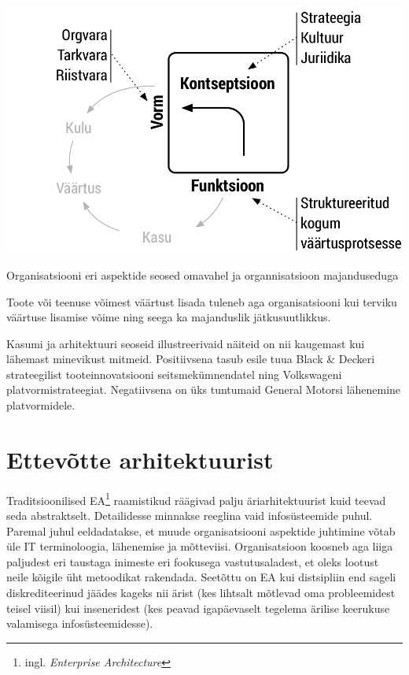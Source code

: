 \documentclass{tufte-book}
\begin{document}
\begin{marginfigure}
	\begin{center}
		\includegraphics[width=\linewidth]{ffc_profit.pdf}
		\caption{Organisatsiooni eri aspektide seosed omavahel ja organnisatsioon majanduseduga}
		\label{fig:arh}
	\end{center}
\end{marginfigure}

Toote või teenuse võimest väärtust lisada tuleneb aga organisatsiooni kui terviku väärtuse lisamise võime ning seega ka majanduslik jätkusuutlikkus. 

Kasumi ja arhitektuuri seoseid illustreerivaid näiteid on nii kaugemast kui lähemast minevikust mitmeid. Positiivsena tasub esile tuua Black \& Deckeri strateegilist tooteinnovatsiooni seitsmekümnendatel ning Volkswageni platvormistrateegiat. Negatiivsena on üks tuntumaid General Motorsi lähenemine platvormidele. 


\section{Ettevõtte arhitektuurist}
Traditsioonilised EA\footnote{ingl. \emph{Enterprise Architecture}} raamistikud räägivad palju äriarhitektuurist kuid teevad seda abstraktselt. Detailidesse minnakse reeglina vaid infosüsteemide puhul. Paremal juhul eeldadatakse, et muude organisatsiooni aspektide juhtimine võtab üle IT terminoloogia, lähenemise ja mõtteviisi. Organisatsioon koosneb aga liiga paljudest eri taustaga inimeste eri fookusega vastutusaladest, et oleks lootust neile kõigile üht metoodikat rakendada.  Seetõttu on EA kui distsipliin end sageli diskrediteerinud jäädes kageks nii ärist (kes lihtsalt mõtlevad oma probleemidest teisel viisil) kui inseneridest (kes peavad igapäevaselt tegelema ärilise keerukuse valamisega infosüsteemidesse). 
\end{document}
